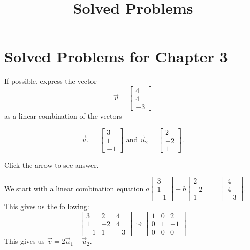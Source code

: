 \documentclass{ximera}
\title{Solved Problems} \license{CC BY-NC-SA 4.0}
\begin{document}
\begin{abstract}
\end{abstract}
\maketitle

\section*{Solved Problems for Chapter 3}

\begin{problem}\label{prb:3.3}
If possible, express the vector
\begin{equation*}
\vec{v}= 
\begin{bmatrix}
4 \\
4 \\
-3
\end{bmatrix}
\end{equation*}
as a linear combination of the vectors

\begin{equation*}
\vec{u}_1 = 
\begin{bmatrix}
3 \\
1 \\
-1
\end{bmatrix}
\mbox{ and  }
\vec{u}_2 =
\begin{bmatrix}
2 \\
-2\\
1
\end{bmatrix}.
\end{equation*}

Click the arrow to see answer.
\begin{expandable}{}{}
    We start with a linear combination equation $a\begin{bmatrix}3\\1\\-1\end{bmatrix}+b\begin{bmatrix}2\\-2\\1\end{bmatrix}=\begin{bmatrix}4\\4\\-3\end{bmatrix}$.  This gives us the following:
    $$\left[
\begin{array}{rr|r}
3 & 2 & 4 \\
1 & -2 & 4\\
-1 & 1 & -3
\end{array}
\right] \rightsquigarrow \left[
\begin{array}{rr|r}1& 0& 2\\
 0& 1 &-1\\
 0& 0& 0\end{array}
\right]$$
This gives us $\vec{v}=2\vec{u}_1 -\vec{u}_2$.
\end{expandable}
\end{problem}
\end{document}
